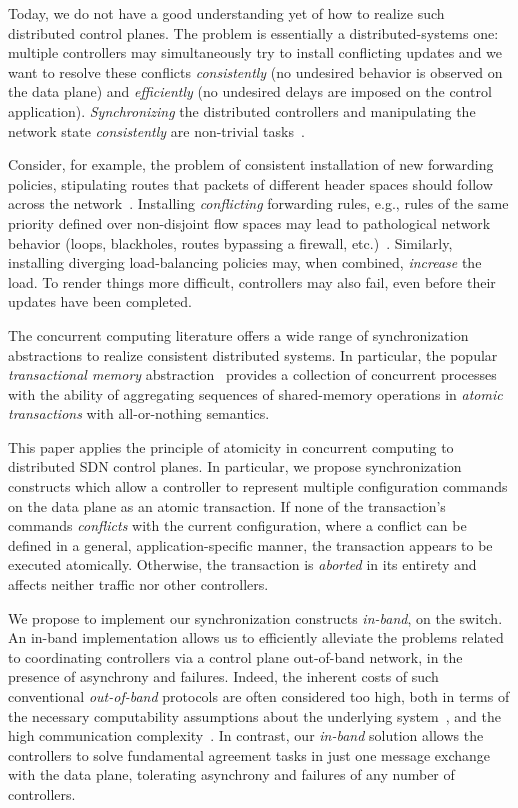 \documentclass[conference]{sigcomm-alternate}
\begin{document}
Today, we do not have a good understanding yet of how to realize
such distributed control planes. The problem is essentially a
distributed-systems
one: multiple controllers may simultaneously try to
install conflicting updates and we want to resolve these conflicts
\emph{consistently} (no undesired behavior is observed on the data
plane) and \emph{efficiently} (no undesired delays are imposed on the
control application).
\emph{Synchronizing}
the distributed controllers and manipulating the network state \emph{consistently}
are non-trivial tasks~\cite{sharon}.

Consider, for example, the problem of
consistent installation of new forwarding policies, stipulating routes
that packets of different header spaces should follow across the
network~\cite{network-update,roger-hotnets,podc15}.
Installing \emph{conflicting} forwarding rules, e.g., rules of the same priority defined over non-disjoint
flow spaces may lead to pathological network behavior (loops,
blackholes, routes bypassing a firewall, etc.)~\cite{hotnets14update,roger-hotnets}.
Similarly, installing diverging load-balancing policies may,
when combined, \emph{increase} the load.
To render things more difficult, controllers may also fail,
even before their updates have been completed.

The concurrent computing literature offers
a wide range of synchronization abstractions
to realize consistent distributed systems.
In particular, the popular \emph{transactional
  memory} abstraction~\cite{tm-book} provides a collection of
concurrent processes with the ability of aggregating sequences of
shared-memory operations in \emph{atomic  transactions} with
all-or-nothing semantics.

This paper applies the principle of atomicity in concurrent computing
to distributed SDN control planes.
%
In particular, we propose synchronization constructs which
allow a controller to represent multiple configuration commands on
the data plane as an atomic transaction.
%
If none of the transaction's commands \emph{conflicts}  with the current
configuration, where a conflict can be
defined in a general, application-specific manner, the transaction appears to be executed atomically.
Otherwise, the transaction is \emph{aborted} in its entirety and 
affects neither traffic nor other controllers.

We propose to implement our synchronization constructs \emph{in-band},
on the switch.
An in-band implementation allows us to efficiently alleviate the problems related to
coordinating controllers via a control plane
out-of-band network, in the presence of asynchrony and failures.
Indeed, the inherent costs  of such conventional \emph{out-of-band} 
protocols are often considered too high, both in
terms of the necessary computability assumptions about the underlying
system~\cite{FLP85}, and the high communication
complexity~\cite{Lam06}.
In contrast, our \emph{in-band} solution allows the
controllers to solve fundamental agreement tasks in just one message
exchange with the data plane, tolerating asynchrony and failures of
any number of controllers.
\end{document}

